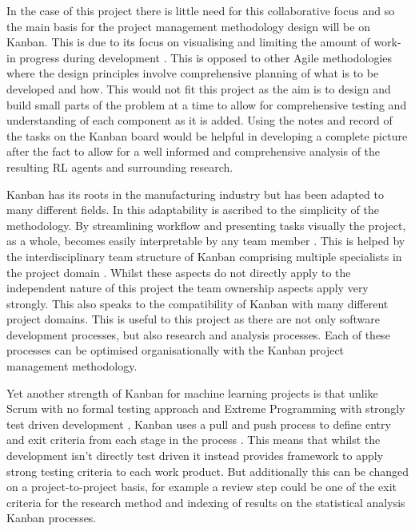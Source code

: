 \documentclass[hidelinks,journal]{IEEEtran}
\begin{document}
In the case of this project there is little need for this collaborative focus and so the main basis for the project management methodology design will be on Kanban. This is due to its focus on visualising and limiting the amount of work-in progress during development \parencite[3]{Matharu15}. This is opposed to other Agile methodologies where the design principles involve comprehensive planning of what is to be developed and how. This would not fit this project as the aim is to design and build small parts of the problem at a time to allow for comprehensive testing and understanding of each component as it is added. Using the notes and record of the tasks on the Kanban board would be helpful in developing a complete picture after the fact to allow for a well informed and comprehensive analysis of the resulting RL agents and surrounding research.

Kanban has its roots in the manufacturing industry but has been adapted to many different fields. In \textcite{Matharu15} this adaptability is ascribed to the simplicity of the methodology. By streamlining workflow and presenting tasks visually the project, as a whole, becomes easily interpretable by any team member \parencite{Ahmad17}. This is helped by the interdisciplinary team structure of Kanban comprising multiple specialists in the project domain \parencite{Matharu15}. Whilst these aspects do not directly apply to the independent nature of this project the team ownership aspects apply very strongly. This also speaks to the compatibility of Kanban with many different project domains. This is useful to this project as there are not only software development processes, but also research and analysis processes. Each of these processes can be optimised organisationally with the Kanban project management methodology.

Yet another strength of Kanban for machine learning projects is that unlike Scrum with no formal testing approach and Extreme Programming with strongly test driven development \parencite{Matharu15}, Kanban uses a pull and push process to define entry and exit criteria from each stage in the process \parencite{Ahmad17}. This means that whilst the development isn’t directly test driven it instead provides framework to apply strong testing criteria to each work product. But additionally this can be changed on a project-to-project basis, for example a review step could be one of the exit criteria for the research method and indexing of results on the statistical analysis Kanban processes.
\end{document}
